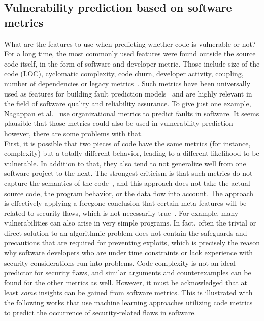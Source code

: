 \documentclass[
a4paper,
pagesize,
pdftex,
12pt,
ngerman,
fleqn,
final,
]{scrartcl}
\begin{document}
	\subsection{Vulnerability prediction based on software metrics}
	What are the features to use when predicting whether code is vulnerable or not? For a long time, the most commonly used features were found outside the source code itself, in the form of software and developer metric. Those include size of the code (LOC), cyclomatic complexity, code churn, developer activity, coupling, number of dependencies or legacy metrics~\cite{Morrison.2015}. Such metrics have been universally used as features for building fault prediction models~\cite{Hall.2011} and are highly relevant in the field of software quality and reliability assurance. To give just one example, Nagappan et al.~\cite{Nagappan.2008} use organizational metrics to predict faults in software. It seems plausible that those metrics could also be used in vulnerability prediction - however, there are some problems with that.\\
	First, it is possible that two pieces of code have the same metrics (for instance, complexity) but a totally different behavior, leading to a different likelihood to be vulnerable. In addition to that, they also tend to not generalize well from one software project to the next. The strongest criticism is that such metrics do not capture the semantics of the code~\cite{Shin.2008}, and this approach does not take the actual source code, the program behavior, or the data flow into account. The approach is effectively applying a foregone conclusion that certain meta features will be related to security flaws, which is not necessarily true~\cite{Hovsepyan.2012}. For example, many vulnerabilities can also arise in very simple programs. In fact, often the trivial or direct solution to an algorithmic problem does not contain the safeguards and precautions that are required for preventing exploits, which is precisely the reason why software developers who are under time constraints or lack experience with security considerations run into problems. Code complexity is not an ideal predictor for security flaws, and similar arguments and counterexamples can be found for the other metrics as well. However, it must be acknowledged that at least \textit{some} insights can be gained from software metrics. This is illustrated with the following works that use machine learning approaches utilizing code metrics to predict the occurrence of security-related flaws in software.\\
\end{document}
